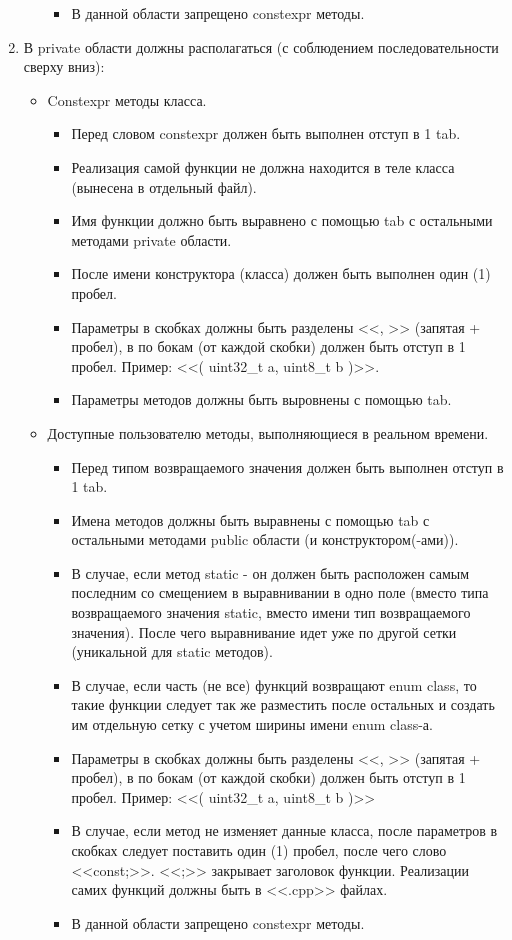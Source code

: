 \begin{enumerate}
\begin{itemize}
\begin{itemize}
			\item В данной области запрещено constexpr методы.
		\end{itemize}
	\end{itemize}
	\item В private области должны располагаться (с соблюдением последовательности сверху вниз):
	\begin{itemize}
	\item Constexpr методы класса.
	\begin{itemize}
		\item Перед словом constexpr должен быть выполнен отступ в 1 tab.
		\item Реализация самой функции не должна находится в теле класса (вынесена в отдельный файл).
		\item Имя функции должно быть выравнено с помощью tab с остальными методами private области.
		\item После имени конструктора (класса) должен быть выполнен один (1) пробел. 
		\item Параметры в скобках должны быть разделены <<, >> (запятая + пробел), в по бокам (от каждой скобки) должен быть отступ в 1 пробел. Пример: <<( uint32\_t a, uint8\_t b )>>.\\
		\item Параметры методов должны быть выровнены с помощью tab.
	\end{itemize}
	\item Доступные пользователю методы, выполняющиеся в реальном времени.
	\begin{itemize}
		\item Перед типом возвращаемого значения должен быть выполнен отступ в 1 tab.
		\item Имена методов должны быть выравнены с помощью tab с остальными методами public области (и конструктором(-ами)).
		\item В случае, если метод static - он должен быть расположен самым последним со смещением в выравнивании в одно поле (вместо типа возвращаемого значения static, вместо имени тип возвращаемого значения). После чего выравнивание идет уже по другой сетки (уникальной для static методов).
		\item В случае, если часть (не все) функций возвращают enum class, то такие функции следует так же разместить после остальных и создать им отдельную сетку с учетом ширины имени enum class-а.
		\item Параметры в скобках должны быть разделены <<, >> (запятая + пробел), в по бокам (от каждой скобки) должен быть отступ в 1 пробел. Пример: <<( uint32\_t a, uint8\_t b )>>
		\item В случае, если метод не изменяет данные класса, после параметров в скобках следует поставить один (1) пробел, после чего слово <<const;>>. <<;>> закрывает заголовок функции. Реализации самих функций должны быть в <<.cpp>> файлах.
		\item В данной области запрещено constexpr методы.
	\end{itemize}
\end{itemize}
\end{enumerate}


